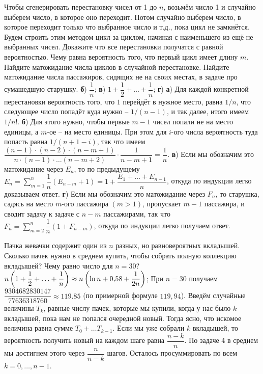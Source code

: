 \documentclass[a4paper,11pt]{article}
\begin{document}
Чтобы сгенерировать перестановку чисел от 1 до $n$, возьмём число 1 и случайно выберем число, в которое оно переходит. Потом случайно выберем число, в которое переходит только что выбранное число и т.д., пока цикл не замкнётся. Будем строить этим методом цикл за циклом, начиная с наименьшего из ещё не выбранных чисел.
 Докажите что все перестановки получатся с равной вероятностью.
 Чему равна вероятность того, что первый цикл имеет длину $m$.
 Найдите матожидание числа циклов в случайной перестановке.
 Найдите матожидание числа пассажиров, сидящих не на своих местах, в задаче про сумашедшую старушку.
\textbf{б}) $\dfrac{1}{n}$; \textbf{в}) $1+\dfrac{1}{2}+\ldots+\dfrac{1}{n}$; \textbf{г})
\textbf{а}) Для каждой конкретной перестановки вероятность того, что $1$ перейдёт в нужное место, равна $1/n$, что следующее число попадёт куда нужно -- $1/(n-1)$, и так далее, итого имеем $1/n!$.
\textbf{б}) Для этого нужно, чтобы первые $m-1$ чисел попали не на место единицы, а $m$-ое -- на место единицы. При этом для $i$-ого числа вероятность туда попасть равна $1/(n+1-i)$, так что имеем $\dfrac{(n-1) \cdot (n-2) \cdot (n-m+1)}{n \cdot (n-1) \cdot \ldots (n-m+2)} \cdot \dfrac{1}{n-m+1} = \dfrac{1}{n}$.
\textbf{в}) Если мы обозначим это матожидание через $E_n$, то по предыдущему $E_n = \sum_{m=1}^n \dfrac{1}{n} (E_{n-m} + 1) = 1 + \dfrac{E_1+\ldots + E_{n-1}}{n}$, откуда по индукции легко доказываем ответ.
\textbf{г}) Если мы обозначим это матожидание через $F_n$, то старушка, садясь на место $m$-ого пассажира $(m>1)$, пропускает $m-1$ пассажира, и сводит задачу к задаче с $n-m$ пассажирами, так что $F_n = \sum_{m=2}^n \dfrac{1}{n} (1 + F_{n-m})$, откуда по индукции легко получаем ответ.
















Пачка жевачки содержит один из $n$ разных, но равновероятных вкладышей.
Сколько пачек нужно в среднем купить, чтобы собрать полную коллекцию вкладышей?
Чему равно число для $n=30$?
$n\left(1+\dfrac{1}{2}+\ldots+\dfrac{1}{n}\right)\approx n \left(\ln n + 0{,}58 + \dfrac{1}{2n}\right)$;
При $n=30$ получаем $\dfrac{9304682830147}{77636318760}\approx119{.}85$ (по примерной формуле $119{,}94$).
Введём случайные величины $T_k$, равные числу пачек, которые мы купили, когда у нас было $k$ вкладышей, пока нам не попался очередной новый. Тогда ясно, что искомое величина равна сумме $T_0+\ldots T_{k-1}$. Если мы уже собрали $k$ вкладышей, то вероятность получить новый на каждом шаге равна $\dfrac{n-k}{n}$.
По задаче 4 в среднем мы достигнем этого через $\dfrac{n}{n-k}$ шагов.
Осталось просуммировать по всем $k=0,\ldots,n-1$.
\end{document}
